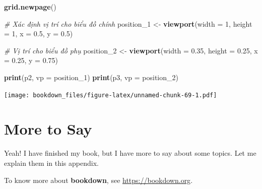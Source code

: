 \documentclass[]{krantz}
\makeatletter
\newenvironment{Shaded}{\begin{snugshade}}{\end{snugshade}}
\newcommand{\CommentTok}[1]{\textcolor[rgb]{0.37,0.37,0.37}{\textit{#1}}}
\newcommand{\DataTypeTok}[1]{\textcolor[rgb]{0.27,0.27,0.27}{#1}}
\newcommand{\DecValTok}[1]{\textcolor[rgb]{0.06,0.06,0.06}{#1}}
\newcommand{\FloatTok}[1]{\textcolor[rgb]{0.06,0.06,0.06}{#1}}
\newcommand{\KeywordTok}[1]{\textcolor[rgb]{0.27,0.27,0.27}{\textbf{#1}}}
\newcommand{\NormalTok}[1]{#1}
\newcommand{\StringTok}[1]{\textcolor[rgb]{0.5,0.5,0.5}{#1}}
\newenvironment{kframe}{%
\medskip{}
\setlength{\fboxsep}{.8em}
 \def\at@end@of@kframe{}%
 \ifinner\ifhmode%
  \def\at@end@of@kframe{\end{minipage}}%
  \begin{minipage}{\columnwidth}%
 \fi\fi%
 \def\FrameCommand##1{\hskip\@totalleftmargin \hskip-\fboxsep
 \colorbox{shadecolor}{##1}\hskip-\fboxsep
     \hskip-\linewidth \hskip-\@totalleftmargin \hskip\columnwidth}%
 \MakeFramed {\advance\hsize-\width
   \@totalleftmargin\z@ \linewidth\hsize
   \@setminipage}}%
 {\par\unskip\endMakeFramed%
 \at@end@of@kframe}
\renewenvironment{Shaded}{\begin{kframe}}{\end{kframe}}
\renewenvironment{Shaded}{\begin{snugshade}}{\end{snugshade}}
\renewcommand{\CommentTok}[1]{\textcolor[rgb]{0.56,0.35,0.01}{\textit{#1}}}
\renewcommand{\DataTypeTok}[1]{\textcolor[rgb]{0.13,0.29,0.53}{#1}}
\renewcommand{\DecValTok}[1]{\textcolor[rgb]{0.00,0.00,0.81}{#1}}
\renewcommand{\FloatTok}[1]{\textcolor[rgb]{0.00,0.00,0.81}{#1}}
\renewcommand{\KeywordTok}[1]{\textcolor[rgb]{0.13,0.29,0.53}{\textbf{#1}}}
\renewcommand{\NormalTok}[1]{#1}
\renewcommand{\StringTok}[1]{\textcolor[rgb]{0.31,0.60,0.02}{#1}}
\theoremstyle{definition}
\theoremstyle{definition}
\theoremstyle{definition}
\theoremstyle{remark}
\makeatother
\begin{document}
\begin{Shaded}
\begin{Highlighting}[]
\KeywordTok{grid.newpage}\NormalTok{()}

\CommentTok{# Xác định vị trí cho biểu đồ chính}
\NormalTok{position_}\DecValTok{1}\NormalTok{ <-}\StringTok{ }\KeywordTok{viewport}\NormalTok{(}\DataTypeTok{width =} \DecValTok{1}\NormalTok{, }\DataTypeTok{height =} \DecValTok{1}\NormalTok{, }
                       \DataTypeTok{x =} \FloatTok{0.5}\NormalTok{, }\DataTypeTok{y =} \FloatTok{0.5}\NormalTok{)  }

\CommentTok{# Vị trí cho biểu đồ phụ}
\NormalTok{position_}\DecValTok{2}\NormalTok{ <-}\StringTok{ }\KeywordTok{viewport}\NormalTok{(}\DataTypeTok{width =} \FloatTok{0.35}\NormalTok{, }\DataTypeTok{height =} \FloatTok{0.25}\NormalTok{, }
                       \DataTypeTok{x =} \FloatTok{0.25}\NormalTok{, }\DataTypeTok{y =} \FloatTok{0.75}\NormalTok{)  }

\KeywordTok{print}\NormalTok{(p2, }\DataTypeTok{vp =}\NormalTok{ position_}\DecValTok{1}\NormalTok{)}
\KeywordTok{print}\NormalTok{(p3, }\DataTypeTok{vp =}\NormalTok{ position_}\DecValTok{2}\NormalTok{)}
\end{Highlighting}
\end{Shaded}

\texttt{[image: bookdown\_files/figure-latex/unnamed-chunk-69-1.pdf]}

\cleardoublepage

\hypertarget{appendix-appendix}{%
\appendix {}}


\hypertarget{more-to-say}{%
\chapter{More to Say}\label{more-to-say}}

Yeah! I have finished my book, but I have more to say about some topics.
Let me explain them in this appendix.

To know more about \textbf{bookdown}, see \url{https://bookdown.org}.



\backmatter
\printindex
\end{document}
